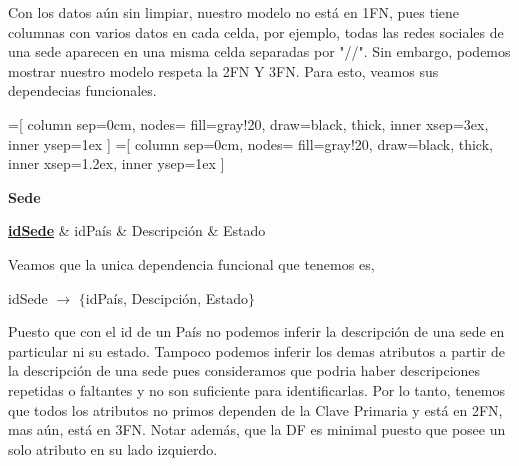 \documentclass[10pt,a4paper]{article}
\begin{document}
Con los datos aún sin limpiar, nuestro modelo no está en 1FN, pues tiene columnas con varios datos en cada celda, por ejemplo, 
todas las redes sociales de una sede aparecen en una misma celda separadas por "//". Sin embargo, podemos mostrar nuestro modelo respeta la 2FN Y 3FN. 
Para esto, veamos sus dependecias funcionales. \vspace{0.2cm}

=[%
    column sep=0cm, %
    nodes={%
        fill=gray!20,
        draw=black,
        thick,
        inner xsep=3ex,
        inner ysep=1ex
    }
]
=[%
    column sep=0cm, %
    nodes={%
        fill=gray!20,
        draw=black,
        thick,
        inner xsep=1.2ex,
        inner ysep=1ex
    }
]


\textbf{Sede} \vspace{0.1cm}

\begin{dependency}
    \raggedright
    \begin{deptext}[TxtBookChico] %
        \textbf{\underline{idSede}}  \& idPaís \& Descripción \& Estado \\
    \end{deptext}
\end{dependency} \vspace{0.3cm}

Veamos que la unica dependencia funcional que tenemos es, \vspace{0.3cm}

 idSede $\rightarrow$ $\{$idPaís, Descipción, Estado$\}$ \vspace{0.3cm}

Puesto que con el id de un País no podemos inferir la descripción de una sede en particular ni su estado. Tampoco podemos inferir los demas atributos
a partir de la descripción de una sede pues consideramos que podria haber descripciones repetidas o faltantes y no son suficiente para identificarlas. 
Por lo tanto, tenemos que todos los atributos no primos dependen de la Clave Primaria y está en 2FN, mas aún, está en 3FN. Notar además, que la DF es minimal puesto
que posee un solo atributo en su lado izquierdo. \vspace{0.3cm}
\end{document}
